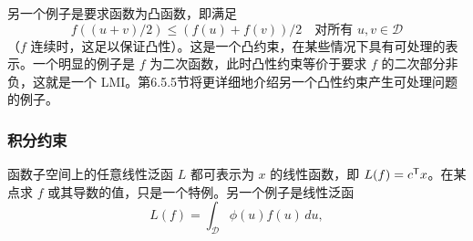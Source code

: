 另一个例子是要求函数为凸函数，即满足
\[f((u+v)/2)\le(f(u)+f(v))/2\quad\text{对所有 }u,v\in\mathcal D\]
（$f$ 连续时，这足以保证凸性）。这是一个凸约束，在某些情况下具有可处理的表示。一个明显的例子是 $f$ 为二次函数，此时凸性约束等价于要求 $f$ 的二次部分非负，这就是一个 LMI。第6.5.5节将更详细地介绍另一个凸性约束产生可处理问题的例子。

\subsubsection*{积分约束}
函数子空间上的任意线性泛函 $L$ 都可表示为 $x$ 的线性函数，即 $L(f)=c^\mathsf T x$。在某点求 $f$ 或其导数的值，只是一个特例。另一个例子是线性泛函
\[L(f)=\int_{\mathcal D}\phi(u)f(u)\,du,\]
